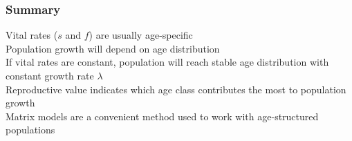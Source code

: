 \documentclass[color=usenames,dvipsnames]{beamer}\usepackage[]{graphicx}\usepackage[]{color}
\begin{document}
\begin{frame}
  \frametitle{Summary}
  Vital rates ($s$ and $f$) are usually age-specific \\
  \pause
  \vfill
  Population growth will depend on age distribution \\
  \pause
  \vfill
  If vital rates are constant, population will reach stable
  age distribution with constant growth rate $\lambda$ \\
  \pause
  \vfill
  Reproductive value indicates which age class contributes the
  most to population growth \\
  \pause
  \vfill
  Matrix models are a convenient method used to work with
  age-structured populations \\
\end{frame}
\end{document}
